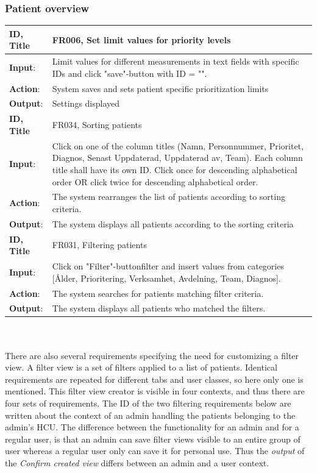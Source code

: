 \documentclass{article}
\begin{document}
\subsubsection{Patient overview}

\begin{tabularx}{\linewidth}{| l |  X |}
\hline
\textbf{ID, Title} & FR006, Set limit values for priority levels  \\ 
\hline
\textbf{Input}: & Limit values for different measurements in text fields with specific IDs and click "save"-button with ID = "".\\
\textbf{Action}: & System saves and sets patient specific prioritization limits \\
\textbf{Output}: & Settings displayed \\
\hline

\textbf{ID, Title} & FR034, Sorting patients  \\ 
\hline
\textbf{Input}: & Click on one of the column titles (Namn, Personnummer, Prioritet, Diagnos, Senast Uppdaterad, Uppdaterad av, Team). Each column title shall have its own ID. Click once for descending alphabetical order OR click twice for descending alphabetical order.  \\
\textbf{Action}: & The system rearranges the list of patients according to sorting criteria. \\
\textbf{Output}: & The system displays all patients according to the sorting criteria\\ 
\hline

 \textbf{ID, Title} & FR031, Filtering patients  \\ 
 \hline
 \textbf{Input}: &  Click on "Filter"-buttonfilter and insert values from categories [Ålder, Prioritering, Verksamhet, Avdelning, Team, Diagnos]. \\
\textbf{Action}: & The system searches for patients matching filter criteria. \\
\textbf{Output}: & The system displays all patients who matched the filters.\\
\hline
\end{tabularx}
\\ \\
There are also several requirements specifying the need for customizing a filter view. A filter view is a set of filters applied to a list of patients. Identical requirements are repeated for different tabs and user classes, so here only one is mentioned. This filter view creator is visible in four contexts, and thus there are four sets of requirements. The ID of the two filtering requirements below are written about the context of an admin handling the patients belonging to the admin's HCU. The difference between the functionality for an admin and for a regular user, is that an admin can save filter views visible to an entire group of user whereas a regular user only can save it for personal use. Thus the \emph{output} of the \emph{Confirm created view} differs between an admin and a user context.
\end{document}
